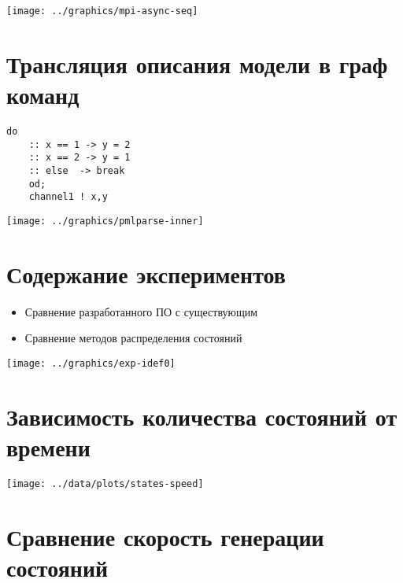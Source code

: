 \documentclass[12pt]{article}
\begin{document}
\begin{center}
  \texttt{[image: ../graphics/mpi-async-seq]}
\end{center}

\section{Трансляция описания модели в граф команд}
\label{sec:pmlparse}

\begin{minipage}[m]{0.35\linewidth}
  \begin{lstlisting}[language=Promela,style=simplecode,numbers=none]
    do
    :: x == 1 -> y = 2
    :: x == 2 -> y = 1
    :: else  -> break
    od;
    channel1 ! x,y
  \end{lstlisting}
\end{minipage}
\begin{minipage}[m]{0.75\linewidth}
  \texttt{[image: ../graphics/pmlparse-inner]}
\end{minipage}

\section{Содержание экспериментов}
\label{sec:experim}

\begin{itemize}
\item Сравнение разработанного ПО с существующим
\item Сравнение методов распределения состояний
\end{itemize}

\begin{center}
  \texttt{[image: ../graphics/exp-idef0]}
\end{center}

\section{Зависимость количества состояний от времени}
\label{sec:states-time}

\begin{center}
  \texttt{[image: ../data/plots/states-speed]}
\end{center}

\section{Сравнение скорость генерации состояний}
\label{sec:stategen-speed}
\end{document}
